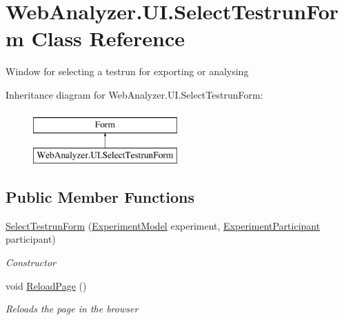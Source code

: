 \hypertarget{class_web_analyzer_1_1_u_i_1_1_select_testrun_form}{}\section{Web\+Analyzer.\+U\+I.\+Select\+Testrun\+Form Class Reference}
\label{class_web_analyzer_1_1_u_i_1_1_select_testrun_form}


Window for selecting a testrun for exporting or analysing  


Inheritance diagram for Web\+Analyzer.\+U\+I.\+Select\+Testrun\+Form\+:\begin{figure}[H]
\begin{center}
\leavevmode
\includegraphics[height=2.000000cm]{class_web_analyzer_1_1_u_i_1_1_select_testrun_form}
\end{center}
\end{figure}
\subsection*{Public Member Functions}
\begin{DoxyCompactItemize}
\item 
\hyperlink{class_web_analyzer_1_1_u_i_1_1_select_testrun_form_ad8de83de444fe5832e7bb01fbd488825}{Select\+Testrun\+Form} (\hyperlink{class_web_analyzer_1_1_models_1_1_base_1_1_experiment_model}{Experiment\+Model} experiment, \hyperlink{class_web_analyzer_1_1_models_1_1_base_1_1_experiment_participant}{Experiment\+Participant} participant)
\begin{DoxyCompactList}\small\item\em Constructor \end{DoxyCompactList}\item 
void \hyperlink{class_web_analyzer_1_1_u_i_1_1_select_testrun_form_ae48e9a01abdea5b4ff4f4c8d219d8e2e}{Reload\+Page} ()
\begin{DoxyCompactList}\small\item\em Reloads the page in the browser \end{DoxyCompactList}\end{DoxyCompactItemize}
